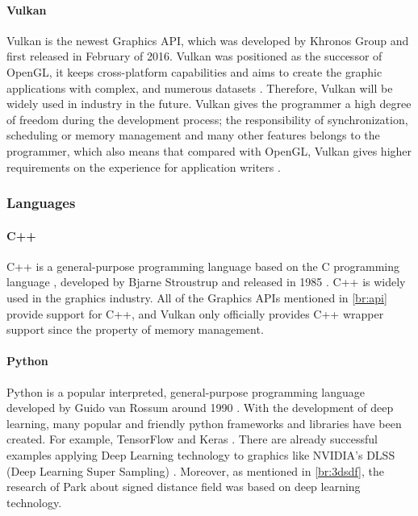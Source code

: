 \paragraph{Vulkan}

Vulkan is the newest Graphics API, which was developed by Khronos Group and first released in February of 2016. Vulkan was positioned as the successor of OpenGL, it keeps cross-platform capabilities and aims to create the graphic applications with complex, and numerous datasets \cite{sellers2016vulkan}. Therefore, Vulkan will be widely used in industry in the future. Vulkan gives the programmer a high degree of freedom during the development process; the responsibility of synchronization, scheduling or memory management and many other features belongs to the programmer, which also means that compared with OpenGL, Vulkan gives higher requirements on the experience for application writers \cite{sellers2016vulkan}.

\subsubsection{Languages}

\paragraph{C++}

C++ is a general-purpose programming language based on the C programming language \cite{c++iso}, developed by Bjarne Stroustrup and released in 1985 \cite{Stroustrup1997}. C++ is widely used in the graphics industry. All of the Graphics APIs mentioned in \ref{br:api} provide support for C++, and Vulkan only officially provides C++ wrapper support since the property of memory management.

\paragraph{Python}

Python \cite{pythonoffcial} is a popular interpreted, general-purpose programming language developed by Guido van Rossum around 1990 \cite{lutz2001programming}. With the development of deep learning, many popular and friendly python frameworks and libraries have been created. For example, TensorFlow \cite{TensorFlow} and Keras \cite{Keras}. There are already successful examples applying Deep Learning technology to graphics like NVIDIA's DLSS (Deep Learning Super Sampling) \cite{DLSS}. Moreover, as mentioned in \ref{br:3dsdf}, the research of Park \cite{park2019deepsdf} about signed distance field was based on deep learning technology.

